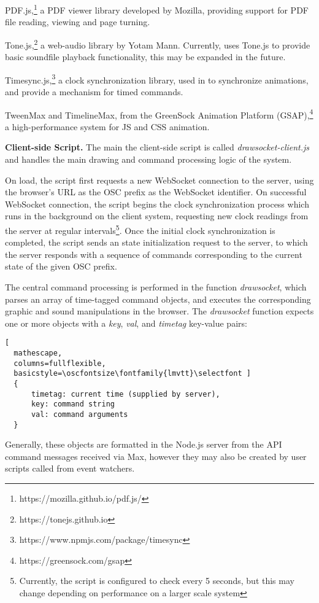 {PDF.js},\footnote{https://mozilla.github.io/pdf.js/} a PDF viewer library developed by Mozilla, providing support for PDF file reading, viewing and page turning.

{Tone.js},\footnote{https://tonejs.github.io} a web-audio library by Yotam Mann. Currently, \drawsocket uses Tone.js to provide basic soundfile playback functionality, this may be expanded in the future.

{Timesync.js},\footnote{https://www.npmjs.com/package/timesync} a clock synchronization library, used in \drawsocket to synchronize animations, and provide a mechanism for timed commands.

 {TweenMax} and {TimelineMax}, from the GreenSock Animation Platform (GSAP),\footnote{https://greensock.com/gsap} a high-performance system for JS and CSS animation.
%
%

\medskip
\noindent
\textbf{Client-side Script.} 
The main the client-side script is called \textit{drawsocket-client.js} and handles the main drawing and command processing logic of the system.

On load, the script first requests a new WebSocket connection to the server, using the browser's URL as the OSC prefix as the WebSocket identifier. On successful WebSocket connection, the script begins the clock synchronization process which runs in the background on the client system, requesting new clock readings from the server at regular intervals\footnote{Currently, the script is configured to check every 5 seconds, but this may change depending on performance on a larger scale system}. Once the initial clock synchronization is completed, the script sends an state initialization request to the server, to which the server responds with a sequence of commands corresponding to the current state of the given OSC prefix.

The central command processing is performed in the function \textit{drawsocket}, which parses an array of time-tagged command objects, and executes the corresponding graphic and sound manipulations in the browser. The \textit{drawsocket} function expects one or more objects with a \textit{key}, \textit{val}, and \textit{timetag} key-value pairs:

\begin{lstlisting}[
  mathescape,
  columns=fullflexible,
  basicstyle=\oscfontsize\fontfamily{lmvtt}\selectfont ]
  {
      timetag: current time (supplied by server),
      key: command string
      val: command arguments
  }
\end{lstlisting}
\noindent
Generally, these objects are formatted in the Node.js server from the API command messages received via Max, however they may also be created by user scripts called from event watchers.

